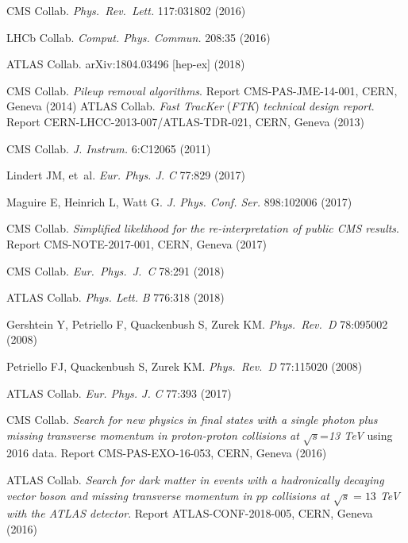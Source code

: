 \documentclass{ar-1col}
\begin{document}
{\begin{thebibliography}{175}
 CMS Collab.  \textit{Phys.\ Rev.\ Lett.}  {117}:031802 (2016)

{LHCb Collab}. \textit{Comput. Phys. Commun.} 208:35 (2016)

{ATLAS Collab}. arXiv:1804.03496 [hep-ex] (2018)

CMS Collab. \textit{Pileup removal algorithms}. Report CMS-PAS-JME-14-001, CERN, Geneva (2014)
%
ATLAS Collab. \textit{Fast TracKer} (\textit{FTK}) \textit{technical design report}. Report CERN-LHCC-2013-007/ATLAS-TDR-021, CERN, Geneva
(2013)

{CMS Collab}. \textit{J. Instrum.} 6:C12065 (2011)

Lindert JM, et~al. \textit{Eur. Phys. J.} \textit{C} 77:829 (2017)

Maguire E, Heinrich L, Watt G. \textit{J. Phys. Conf. Ser.}
898:102006 (2017)

CMS Collab. \textit{Simplified likelihood for the re-interpretation of public CMS results}. Report CMS-NOTE-2017-001, CERN, Geneva (2017)

{CMS Collab.} \textit{Eur.\ Phys.\ J.\ C} {78}:291 (2018)

{ATLAS Collab.} \textit{Phys. Lett.} \textit{B} 776:318 (2018)

Gershtein Y, Petriello F, Quackenbush S, Zurek KM. \textit{Phys.\ Rev.\ D }{78}:095002 (2008)

Petriello FJ, Quackenbush S, Zurek KM. \textit{Phys.\ Rev.\ D} {77}:115020 (2008)
  
{ATLAS Collab.} \textit{Eur. Phys. J.} \textit{C} 77:393 (2017)

CMS Collab. \textit{Search for new physics in final states with a single photon plus missing transverse momentum in proton-proton collisions at} $\sqrt{s}$=\textit{13 TeV} using 2016 data. Report CMS-PAS-EXO-16-053, CERN, Geneva (2016)

ATLAS Collab. \textit{Search for dark matter in events with a hadronically
                       decaying vector boson and missing transverse momentum in
                       $pp$ collisions at $\sqrt{s} = 13$ TeV with the ATLAS
                       detector}. Report ATLAS-CONF-2018-005, CERN, Geneva (2016)


\end{thebibliography}}
\end{document}
